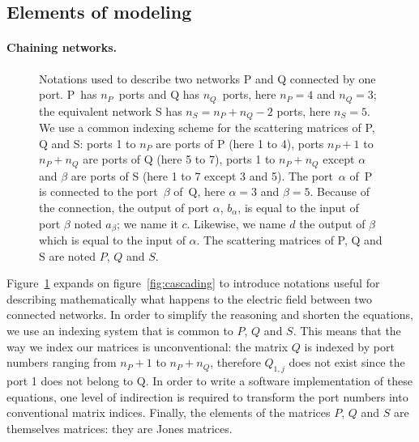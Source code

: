 \documentclass[a4paper,11pt]{article}
\begin{document}

\subsection{Elements of modeling}
\paragraph{Chaining networks.}
\begin{figure}[hbtp]
    \centering
    
    \caption{\label{fig:between_networks}
        Notations used to describe two networks P and Q connected by one port.
        P~has $n_P$~ports and Q has $n_Q$~ports, here $n_P=4$ and $n_Q=3$;
        the equivalent network S has $n_S = n_P + n_Q - 2$ ports, here $n_S=5$.
        We use a common indexing scheme for the scattering matrices of P, Q and S:
        ports 1 to $n_P$ are ports of P (here 1 to 4),
        ports $n_P+1$ to $n_P+n_Q$ are ports of Q (here 5 to 7),
        ports 1 to $n_P+n_Q$ except $\alpha$ and $\beta$ are ports of S (here 1 to 7 except 3 and 5).
        The port~$\alpha$ of~P is connected to the port~$\beta$ of~Q, here $\alpha=3$ and $\beta=5$.
        Because of the connection, the output of port $\alpha$, $b_\alpha$, is equal to the input of port $\beta$ noted $a_\beta$; we name it $c$.  Likewise, we name $d$ the output of $\beta$ which is equal to the input of $\alpha$.
        The scattering matrices of P, Q and S are noted $P$, $Q$ and $S$.
        }
\end{figure}
Figure~\ref{fig:between_networks} expands on figure~\ref{fig:cascading} to introduce notations useful for describing mathematically what happens to the electric field between two connected networks.
In order to simplify the reasoning and shorten the equations, we use an indexing system that is common to $P$, $Q$ and $S$.  This means that the way we index our matrices is unconventional: the matrix $Q$ is indexed by port numbers ranging from $n_P+1$ to $n_P + n_Q$, therefore $Q_{1, j}$ does not exist since the port 1 does not belong to Q.  In order to write a software implementation of these equations, one level of indirection is required to transform the port numbers into conventional matrix indices.
Finally, the elements of the matrices $P$, $Q$ and $S$ are themselves matrices: they are Jones matrices.
\end{document}
